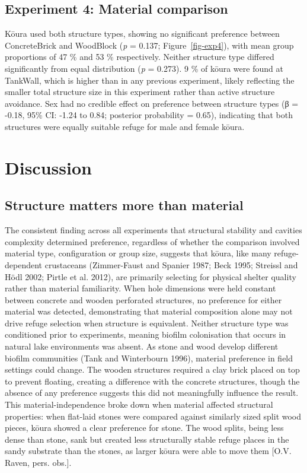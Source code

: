 \documentclass[
  12pt,
  a4paper,
  oneside]{scrbook}
\begin{document}
\subsection{Experiment 4: Material
comparison}\label{experiment-4-material-comparison-1}

Kōura used both structure types, showing no significant preference
between ConcreteBrick and WoodBlock (\emph{p} = 0.137;
Figure~\ref{fig-exp4}), with mean group proportions of 47 \% and 53 \%
respectively. Neither structure type differed significantly from equal
distribution (\emph{p} = 0.273). 9 \% of kōura were found at TankWall,
which is higher than in any previous experiment, likely reflecting the
smaller total structure size in this experiment rather than active
structure avoidance. Sex had no credible effect on preference between
structure types (β = -0.18, 95\% CI: -1.24 to 0.84; posterior
probability = 0.65), indicating that both structures were equally
suitable refuge for male and female kōura.

\section{Discussion}\label{discussion-2}

\subsection{Structure matters more than
material}\label{structure-matters-more-than-material}

The consistent finding across all experiments that structural stability
and cavities complexity determined preference, regardless of whether the
comparison involved material type, configuration or group size, suggests
that kōura, like many refuge-dependent crustaceans (Zimmer-Faust and
Spanier 1987; Beck 1995; Streissl and Hödl 2002; Pirtle et al. 2012),
are primarily selecting for physical shelter quality rather than
material familiarity. When hole dimensions were held constant between
concrete and wooden perforated structures, no preference for either
material was detected, demonstrating that material composition alone may
not drive refuge selection when structure is equivalent. Neither
structure type was conditioned prior to experiments, meaning biofilm
colonisation that occurs in natural lake environments was absent. As
stone and wood develop different biofilm communities (Tank and
Winterbourn 1996), material preference in field settings could change.
The wooden structures required a clay brick placed on top to prevent
floating, creating a difference with the concrete structures, though the
absence of any preference suggests this did not meaningfully influence
the result. This material-independence broke down when material affected
structural properties: when flat-laid stones were compared against
similarly sized split wood pieces, kōura showed a clear preference for
stone. The wood splits, being less dense than stone, sank but created
less structurally stable refuge places in the sandy substrate than the
stones, as larger kōura were able to move them {[}O.V. Raven, pers.
obs.{]}.
\end{document}
